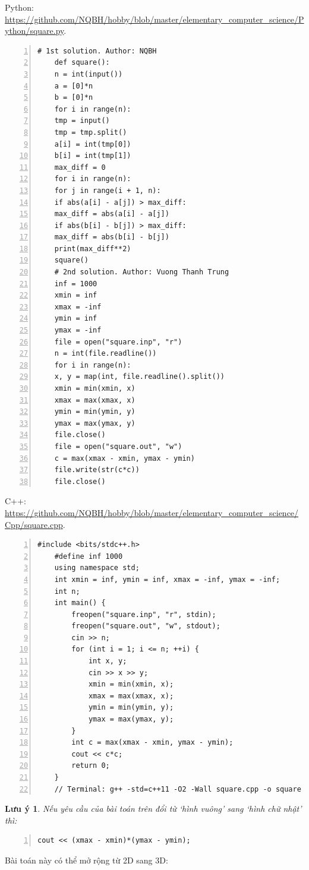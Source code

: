 \documentclass{article}
\newtheorem{luuy}{Lưu ý}
\begin{document}
Python: \url{https://github.com/NQBH/hobby/blob/master/elementary_computer_science/Python/square.py}.
\begin{Verbatim}[numbers=left,xleftmargin=5mm]
	# 1st solution. Author: NQBH
	def square():
	n = int(input())
	a = [0]*n
	b = [0]*n
	for i in range(n):
	tmp = input()
	tmp = tmp.split()
	a[i] = int(tmp[0])
	b[i] = int(tmp[1])
	max_diff = 0
	for i in range(n):
	for j in range(i + 1, n):
	if abs(a[i] - a[j]) > max_diff:
	max_diff = abs(a[i] - a[j])
	if abs(b[i] - b[j]) > max_diff:
	max_diff = abs(b[i] - b[j])
	print(max_diff**2)
	square()
	# 2nd solution. Author: Vuong Thanh Trung
	inf = 1000
	xmin = inf
	xmax = -inf
	ymin = inf
	ymax = -inf
	file = open("square.inp", "r")
	n = int(file.readline())
	for i in range(n):
	x, y = map(int, file.readline().split())
	xmin = min(xmin, x)
	xmax = max(xmax, x)
	ymin = min(ymin, y)
	ymax = max(ymax, y)
	file.close()
	file = open("square.out", "w")
	c = max(xmax - xmin, ymax - ymin)
	file.write(str(c*c))
	file.close()
\end{Verbatim}
C++: \url{https://github.com/NQBH/hobby/blob/master/elementary_computer_science/Cpp/square.cpp}.
\begin{Verbatim}[numbers=left,xleftmargin=5mm]
	#include <bits/stdc++.h>
	#define inf 1000
	using namespace std;
	int xmin = inf, ymin = inf, xmax = -inf, ymax = -inf;
	int n;
	int main() {
		freopen("square.inp", "r", stdin);
		freopen("square.out", "w", stdout);
		cin >> n;
		for (int i = 1; i <= n; ++i) {
			int x, y;
			cin >> x >> y;
			xmin = min(xmin, x);
			xmax = max(xmax, x);
			ymin = min(ymin, y);
			ymax = max(ymax, y);
		}
		int c = max(xmax - xmin, ymax - ymin);
		cout << c*c;
		return 0;
	}
	// Terminal: g++ -std=c++11 -O2 -Wall square.cpp -o square
\end{Verbatim}

\begin{luuy}
	Nếu yêu cầu của bài toán trên đổi từ `hình vuông' sang `hình chữ nhật' thì:
	\begin{Verbatim}[numbers=left,xleftmargin=5mm]
		cout << (xmax - xmin)*(ymax - ymin);
	\end{Verbatim}
\end{luuy}
Bài toán này có thể mở rộng từ 2D sang 3D:
\end{document}
